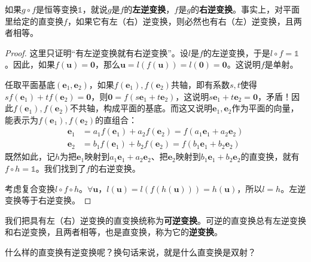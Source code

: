 \documentclass[12pt,UTF8]{ctexbook}
\begin{document}
如果$g\circ f$是恒等变换$\mathds{1}$，就说$g$是$f$的\textbf{左逆变换}，$f$是$g$的\textbf{右逆变换}。事实上，对平面里给定的直变换$f$，如果它有左（右）逆变换，则必然也有右（左）逆变换，且两者相等。

\begin{proof}
    这里只证明“有左逆变换就有右逆变换”。设$l$是$f$的左逆变换，于是$l\circ f = \mathds{1}$。因此，如果$f(\mathbf{u}) = \mathbf{0}$，那么$\mathbf{u} = l(f(\mathbf{u})) = l(\mathbf{0}) = \mathbf{0}$。这说明$f$是单射。
    
    任取平面基底$(\mathbf{e}_1,\mathbf{e}_2)$，如果$f(\mathbf{e}_1),f(\mathbf{e}_2)$共轴，即有系数$s,t$使得$sf(\mathbf{e}_1)+tf(\mathbf{e}_2)=\mathbf{0}$，则$\mathbf{0} = f(s\mathbf{e}_1+t\mathbf{e}_2)$，这说明$s\mathbf{e}_1+t\mathbf{e}_2 = \mathbf{0}$，矛盾！因此$f(\mathbf{e}_1),f(\mathbf{e}_2)$不共轴，构成平面的基底。而这又说明$\mathbf{e}_1,\mathbf{e}_2$作为平面的向量，能表示为$f(\mathbf{e}_1),f(\mathbf{e}_2)$的直组合：
    \begin{align*}
        \mathbf{e}_1 & = a_1f(\mathbf{e}_1) + a_2f(\mathbf{e}_2) = f(a_1\mathbf{e}_1+a_2\mathbf{e}_2)\\ 
        \mathbf{e}_2 & = b_1f(\mathbf{e}_1) + b_2f(\mathbf{e}_2) = f(b_1\mathbf{e}_1+b_2\mathbf{e}_2)
    \end{align*}
    既然如此，记$h$为把$\mathbf{e}_1$映射到$a_1\mathbf{e}_1+a_2\mathbf{e}_2$、把$\mathbf{e}_2$映射到$b_1\mathbf{e}_1+b_2\mathbf{e}_2$的直变换，就有$f\circ h = \mathds{1}$。我们找到了$f$的右逆变换。

    考虑复合变换$l\circ f\circ h$。$\forall \mathbf{u}$，$l(\mathbf{u}) = l(f(h(\mathbf{u}))) = h(\mathbf{u})$，所以$l = h$。左逆变换等于右逆变换。
\end{proof}

我们把具有左（右）逆变换的直变换统称为\textbf{可逆变换}。可逆的直变换总有左逆变换和右逆变换，且两者相等，也是直变换，称为它的\textbf{逆变换}。

什么样的直变换有逆变换呢？换句话来说，就是什么直变换是双射？
\end{document}
